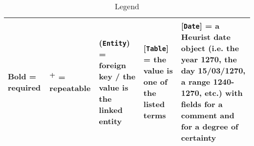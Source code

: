 \documentclass[a3paper, landscape]{report}
\begin{document}


    \begin{center}
        
    \end{center}

    \begin{table}[b]
        \caption*{Legend}
        \begin{tabularx}{\textwidth}{|l|l|l|l|X|}
        \hline
        \footnotesize{\textbf{Bold} = required}
        & \footnotesize{\textsuperscript{+} = repeatable}
        & \footnotesize{(\texttt{Entity}) = foreign key / the value is the linked entity}
        & \footnotesize{[\texttt{Table}]} = the value is one of the listed terms
        & \footnotesize{[\texttt{Date}] = a Heurist date object (i.e. the year 1270, the day 15/03/1270, a range 1240-1270, etc.) with fields for a comment and for a degree of certainty}\\
        \hline
    \end{tabularx}
    \end{table}
\end{document}
